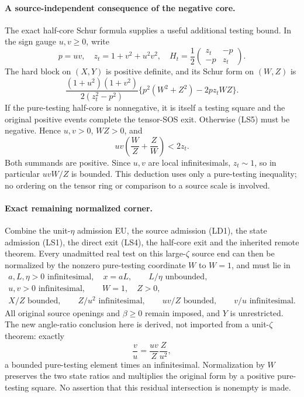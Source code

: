 \paragraph{A source-independent consequence of the negative core.}
The exact half-core Schur formula supplies a useful additional
testing bound. In the sign gauge $u,v\ge0$, write
\[
 p=uv,\quad z_t=1+v^2+u^2v^2,\quad
 H_t=\frac12\begin{pmatrix}z_t&-p\\-p&z_t\end{pmatrix}.
\]
The hard block on $(X,Y)$ is positive definite, and its Schur form
on $(W,Z)$ is
\[
 \frac{(1+u^2)(1+v^2)}{2(z_t^2-p^2)}
          \{p^2(W^2+Z^2)-2pz_tWZ\}.                 \tag{LS5}
\]
If the pure-testing half-core is nonnegative, it is itself a testing
square and the original positive events complete the tensor-SOS exit.
Otherwise (LS5) must be negative. Hence $u,v>0$, $WZ>0$, and
\[
       uv\left(\frac WZ+\frac ZW\right)<2z_t.
\]
Both summands are positive. Since $u,v$ are local infinitesimals,
$z_t\sim1$, so in particular $uvW/Z$ is bounded. This deduction
uses only a pure-testing inequality; no ordering on the tensor ring
or comparison to a source scale is involved.

\paragraph{Exact remaining normalized corner.}
Combine the unit-$\eta$ admission EU, the source admission (LD1),
the state admission (LS1), the direct exit (LS4), the half-core exit
and the inherited remote theorem. Every unadmitted real test on this
large-$\zeta$ source end can then be normalized by the nonzero
pure-testing coordinate $W$ to $W=1$, and must lie in
\[
\begin{gathered}
 a,L,\eta>0\text{ infinitesimal},\quad x=aL,
       \qquad L/\eta\text{ unbounded},\\
 u,v>0\text{ infinitesimal},\qquad W=1,\quad Z>0,\\
 X/Z\text{ bounded},\qquad Z/u^2\text{ infinitesimal},
             \qquad uv/Z\text{ bounded},\qquad v/u\text{ infinitesimal}.
\end{gathered}                                                     \tag{LS6}
\]
All original source openings and $\beta\ge0$ remain imposed, and
$Y$ is unrestricted. The new angle-ratio conclusion here is derived,
not imported from a unit-$\zeta$ theorem: exactly
\[
                 \frac vu=\frac{uv}{Z}\frac{Z}{u^2},
\]
a bounded pure-testing element times an infinitesimal. Normalization
by $W$ preserves the two state ratios and multiplies the original
form by a positive pure-testing square. No assertion that this
residual intersection is nonempty is made.

